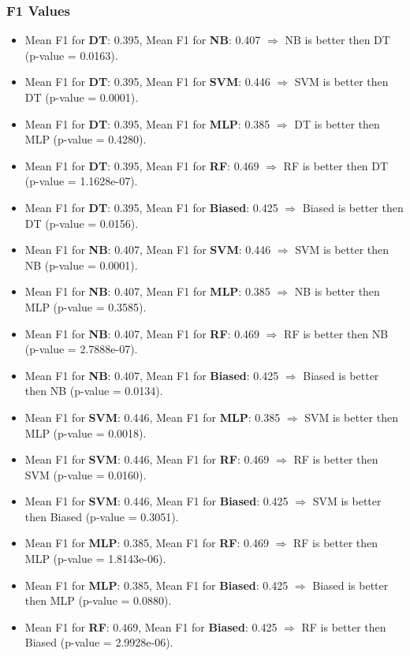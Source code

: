 \documentclass{article}
\begin{document}
\subsubsection{F1 Values}
\begin{itemize}
    \item Mean F1 for \textbf{DT}: 0.395, Mean F1 for \textbf{NB}: 0.407 $\Rightarrow$ NB is better then DT (p-value = 0.0163).
    \item Mean F1 for \textbf{DT}: 0.395, Mean F1 for \textbf{SVM}: 0.446 $\Rightarrow$ SVM is better then DT (p-value = 0.0001).
    \item Mean F1 for \textbf{DT}: 0.395, Mean F1 for \textbf{MLP}: 0.385 $\Rightarrow$ DT is better then MLP (p-value = 0.4280).
    \item Mean F1 for \textbf{DT}: 0.395, Mean F1 for \textbf{RF}: 0.469 $\Rightarrow$ RF is better then DT (p-value = 1.1628e-07).
    \item Mean F1 for \textbf{DT}: 0.395, Mean F1 for \textbf{Biased}: 0.425 $\Rightarrow$ Biased is better then DT (p-value = 0.0156).
    \item Mean F1 for \textbf{NB}: 0.407, Mean F1 for \textbf{SVM}: 0.446 $\Rightarrow$ SVM is better then NB (p-value = 0.0001).
    \item Mean F1 for \textbf{NB}: 0.407, Mean F1 for \textbf{MLP}: 0.385 $\Rightarrow$ NB is better then MLP (p-value = 0.3585).
    \item Mean F1 for \textbf{NB}: 0.407, Mean F1 for \textbf{RF}: 0.469 $\Rightarrow$ RF is better then NB (p-value = 2.7888e-07).
    \item Mean F1 for \textbf{NB}: 0.407, Mean F1 for \textbf{Biased}: 0.425 $\Rightarrow$ Biased is better then NB (p-value = 0.0134).
    \item Mean F1 for \textbf{SVM}: 0.446, Mean F1 for \textbf{MLP}: 0.385 $\Rightarrow$ SVM is better then MLP (p-value = 0.0018).
    \item Mean F1 for \textbf{SVM}: 0.446, Mean F1 for \textbf{RF}: 0.469 $\Rightarrow$ RF is better then SVM (p-value = 0.0160).
    \item Mean F1 for \textbf{SVM}: 0.446, Mean F1 for \textbf{Biased}: 0.425 $\Rightarrow$ SVM is better then Biased (p-value = 0.3051).
    \item Mean F1 for \textbf{MLP}: 0.385, Mean F1 for \textbf{RF}: 0.469 $\Rightarrow$ RF is better then MLP (p-value = 1.8143e-06).
    \item Mean F1 for \textbf{MLP}: 0.385, Mean F1 for \textbf{Biased}: 0.425 $\Rightarrow$ Biased is better then MLP (p-value = 0.0880).
    \item Mean F1 for \textbf{RF}: 0.469, Mean F1 for \textbf{Biased}: 0.425 $\Rightarrow$ RF is better then Biased (p-value = 2.9928e-06).
\end{itemize}
\end{document}

